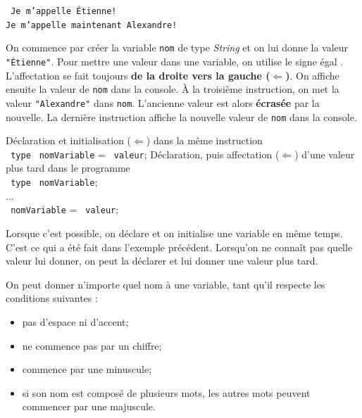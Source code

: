\documentclass[12pt]{report}
\newcommand{\commande}[1]{%
\tcbox[on line, size=fbox, colframe=black, boxrule=0.75pt, tcbox raise base]{#1} %
}
\begin{document}
\begin{tcolorbox}[title={Sortie console}, sharp corners = south, boxsep = 1.5mm] \tt
	Je m'appelle Étienne!\\
	Je m'appelle maintenant Alexandre!
\end{tcolorbox}

On commence par créer la variable \texttt{nom} de type \emph{String} et on lui donne la valeur \texttt{"Étienne"}. Pour mettre une valeur dans une variable, on utilise le signe égal \commande{=}. L'affectation se fait toujours \textbf{de la droite vers la gauche ($\boldsymbol{\Leftarrow}$)}. On affiche ensuite la valeur de \texttt{nom} dans la console. À la troisième instruction, on met la valeur \texttt{"Alexandre"} dans \texttt{nom}. L'ancienne valeur est alors \textbf{écrasée} par la nouvelle. La dernière instruction affiche la nouvelle valeur de \texttt{nom} dans la console.


%
\begin{tcolorbox}[enhanced,colframe=ultRed,
	title={Déclaration et initialisation de variables},
	sharp corners=south,
	boxsep = 1.5mm]
Déclaration et initialisation ($\Leftarrow$) dans la même instruction\\
\texttt{\color{ultRed} type} \texttt{\color[RGB]{255, 34, 12} nomVariable} = \texttt{\color[RGB]{63, 136, 197} valeur};%
%
\tcblower
%
Déclaration, puis affectation ($\Leftarrow$) d'une valeur  plus tard dans le programme\\
\texttt{\color{ultRed} type} \texttt{\color[RGB]{255, 34, 12} nomVariable};\\
...\\
\texttt{\color[RGB]{255, 34, 12} nomVariable} = \texttt{\color[RGB]{63, 136, 197} valeur};
\end{tcolorbox}


Lorsque c'est possible, on déclare et on initialise une variable en même temps. C'est ce qui a été fait dans l'exemple précédent. Lorsqu'on ne connaît pas quelle valeur lui donner, on peut la déclarer et lui donner une valeur plus tard.

On peut donner n'importe quel nom à une variable, tant qu'il respecte les conditions suivantes :
\begin{itemize}
	\item pas d'espace ni d'accent;
	\item ne commence pas par un chiffre;
	\item commence par une minuscule;
	\item si son nom est composé de plusieurs mots, les autres mots peuvent commencer par une majuscule.
\end{itemize}
\end{document}
